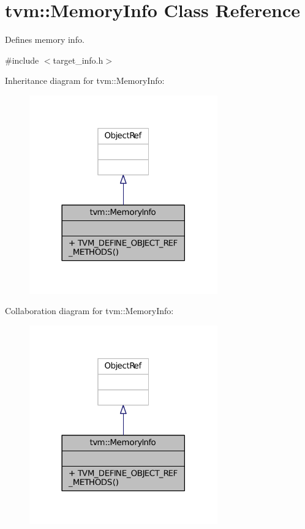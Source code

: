 \hypertarget{classtvm_1_1MemoryInfo}{}\section{tvm\+:\+:Memory\+Info Class Reference}
\label{classtvm_1_1MemoryInfo}


Defines memory info.  




{\ttfamily \#include $<$target\+\_\+info.\+h$>$}



Inheritance diagram for tvm\+:\+:Memory\+Info\+:
\nopagebreak
\begin{figure}[H]
\begin{center}
\leavevmode
\includegraphics[width=230pt]{classtvm_1_1MemoryInfo__inherit__graph}
\end{center}
\end{figure}


Collaboration diagram for tvm\+:\+:Memory\+Info\+:
\nopagebreak
\begin{figure}[H]
\begin{center}
\leavevmode
\includegraphics[width=230pt]{classtvm_1_1MemoryInfo__coll__graph}
\end{center}
\end{figure}
